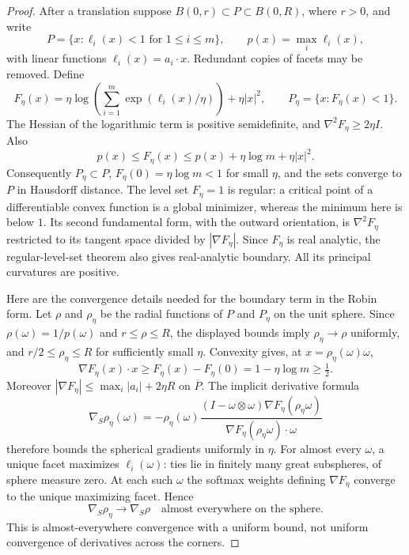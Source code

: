 \documentclass[11pt,a4paper]{article}
\theoremstyle{definition}\newtheorem{definition}[theorem]{Definition}
\theoremstyle{remark}\newtheorem{remark}[theorem]{Remark}
\begin{document}
\begin{proof}
After a translation suppose $B(0,r)\subset P\subset B(0,R)$, where
$r>0$, and write
\[
 P=\{x:\ell_i(x)<1\text{ for }1\leq i\leq m\},
 \qquad p(x)=\max_i\ell_i(x),
\]
with linear functions $\ell_i(x)=a_i\cdot x$. Redundant copies of
facets may be removed. Define
\[
 F_\eta(x)=\eta\log\!\left(\sum_{i=1}^m
                    \exp(\ell_i(x)/\eta)\right)+\eta|x|^2,
 \qquad P_\eta=\{x:F_\eta(x)<1\}.
\]
The Hessian of the logarithmic term is positive semidefinite, and
$\nabla^2F_\eta\geq2\eta I$. Also
\[
 p(x)\leq F_\eta(x)
 \leq p(x)+\eta\log m+\eta|x|^2.
\]
Consequently $P_\eta\subset P$, $F_\eta(0)=\eta\log m<1$ for small
$\eta$, and the sets converge to $P$ in Hausdorff distance. The level
set $F_\eta=1$ is regular: a critical point of a differentiable convex
function is a global minimizer, whereas the minimum here is below $1$.
Its second fundamental form, with the outward orientation, is
$\nabla^2F_\eta$ restricted to its tangent space divided by
$|\nabla F_\eta|$. Since $F_\eta$ is real analytic, the regular-level-set theorem
also gives real-analytic boundary. All its principal
curvatures are positive.

Here are the convergence details needed for the boundary term in the
Robin form. Let $\rho$ and $\rho_\eta$ be the radial functions of $P$
and $P_\eta$ on the unit sphere. Since
$\rho(\omega)=1/p(\omega)$ and $r\leq\rho\leq R$, the displayed
bounds imply $\rho_\eta\to\rho$ uniformly, and
$r/2\leq\rho_\eta\leq R$ for sufficiently small $\eta$. Convexity gives,
at $x=\rho_\eta(\omega)\omega$,
\[
 \nabla F_\eta(x)\cdot x
 \geq F_\eta(x)-F_\eta(0)=1-\eta\log m\geq\tfrac12.
\]
Moreover $|\nabla F_\eta|\leq\max_i|a_i|+2\eta R$ on $\overline P$.
The implicit derivative formula
\[
 \nabla_{\!S}\rho_\eta(\omega)
 =-\rho_\eta(\omega)
 \frac{(I-\omega\otimes\omega)
       \nabla F_\eta(\rho_\eta\omega)}
      {\nabla F_\eta(\rho_\eta\omega)\cdot\omega}
\]
therefore bounds the spherical gradients uniformly in $\eta$.
For almost every $\omega$, a unique facet maximizes $\ell_i(\omega)$:
ties lie in finitely many great subspheres, of sphere measure zero.
At each such $\omega$ the softmax weights defining $\nabla F_\eta$
converge to the unique maximizing facet. Hence
\[
 \nabla_{\!S}\rho_\eta\longrightarrow\nabla_{\!S}\rho
 \quad\text{almost everywhere on the sphere}.
\]
This is almost-everywhere convergence with a uniform bound, not
uniform convergence of derivatives across the corners.


\end{proof}
\end{document}
